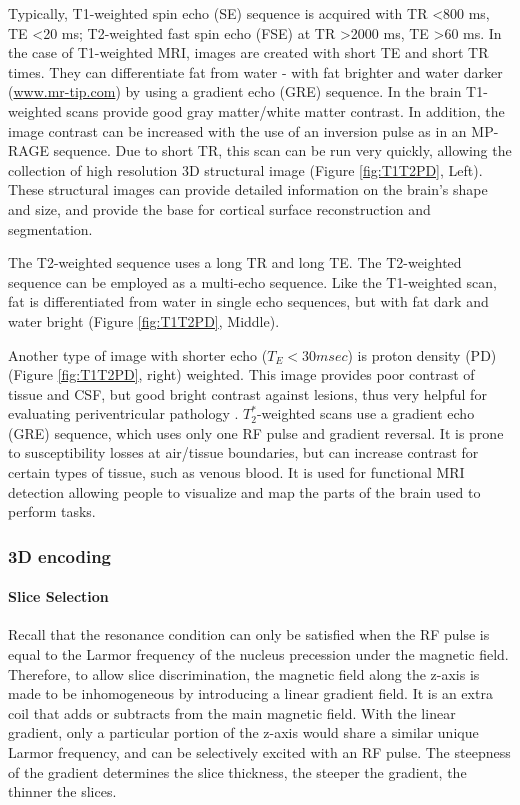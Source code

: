 Typically, T1-weighted spin echo (SE)  sequence is acquired with TR \textless 800 ms, TE \textless 20 ms; T2-weighted fast spin echo (FSE) at TR \textgreater 2000 ms, TE \textgreater 60 ms. 
In the case of T1-weighted MRI, images are created with short TE and short TR times. They can differentiate fat from water - with fat brighter and water darker (\url{www.mr-tip.com}) by using a gradient echo (GRE) sequence. In the brain T1-weighted scans provide good gray matter/white matter contrast. In addition, the image contrast can be increased with the use of an inversion pulse as in an MP-RAGE sequence. Due to short TR, this scan can be run very quickly, allowing the collection of high resolution 3D structural image (Figure \ref{fig:T1T2PD}, Left). These structural images can provide detailed information on the brain's shape and size, and provide the base for cortical surface reconstruction and segmentation. 

The T2-weighted sequence uses a long TR and long TE. The T2-weighted sequence can be employed as a multi-echo sequence. Like the T1-weighted scan, fat is
differentiated from water in single echo sequences, but with fat dark and water bright (Figure \ref{fig:T1T2PD}, Middle).  

Another type of image with shorter echo ($T_E<30msec$) is proton density (PD) (Figure \ref{fig:T1T2PD}, right) weighted. This image provides poor contrast of tissue and CSF, but good bright contrast against lesions, thus very helpful for evaluating periventricular pathology . $T_2^*$-weighted scans use a gradient echo (GRE) sequence, which uses only one RF pulse and gradient reversal. It is prone to susceptibility losses at air/tissue boundaries, but can increase contrast for certain types of tissue, such as venous blood. It is used for functional MRI detection allowing people to visualize and map the parts of the brain used to perform tasks. 

\subsubsection{3D encoding}

\paragraph{Slice Selection} Recall that the resonance condition can only be satisfied when the RF pulse is equal to the Larmor frequency of the nucleus precession under the magnetic field. 
Therefore, to allow slice discrimination, the magnetic field along the z-axis is made to be inhomogeneous by introducing a linear gradient field. It is an extra coil that adds or subtracts from the main magnetic field. With the linear gradient, only a particular portion of the z-axis would share a similar unique Larmor frequency, and can be selectively excited with an RF pulse. The steepness of the gradient determines the slice thickness, the steeper the gradient, the thinner the slices.  

